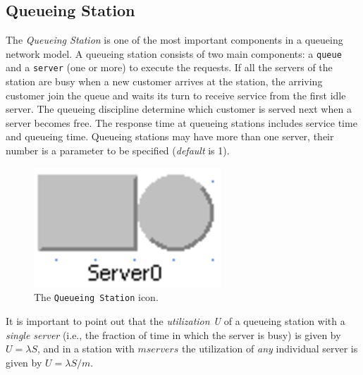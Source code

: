 \subsection{Queueing Station}
 The \emph{Queueing Station} is one of the most
important components in a queueing network model. A queueing
station consists of two main components: a \texttt{queue} and a
\texttt{server} (one or more) to execute the requests. If all the
servers of the station are busy when a new customer arrives at the
station, the arriving customer join the queue and waits its turn
to receive service from the first idle server. The queueing
discipline determine which customer is served next when a server
becomes free. The response time at queueing stations includes
service time and queueing time. Queueing stations may have more
than one server, their number is a parameter to be specified
(\emph{default} is 1).
\begin{figure}[htb]
    \begin{center}
        \includegraphics[scale=.5]{img/jsimg/8.29.eps}
    \end{center}
    \caption{The \texttt{Queueing Station} icon.}
    \label{fig:questat}
\end{figure}
It is important to point out that the \emph{utilization U} of a
queueing station with a \emph{single server} (i.e., the fraction
of time in which the server is busy) is given by $U=\lambda S$,
and in a station with $m servers$ the utilization of \emph{any}
individual server
is given by $U=\lambda S /m$.\\

